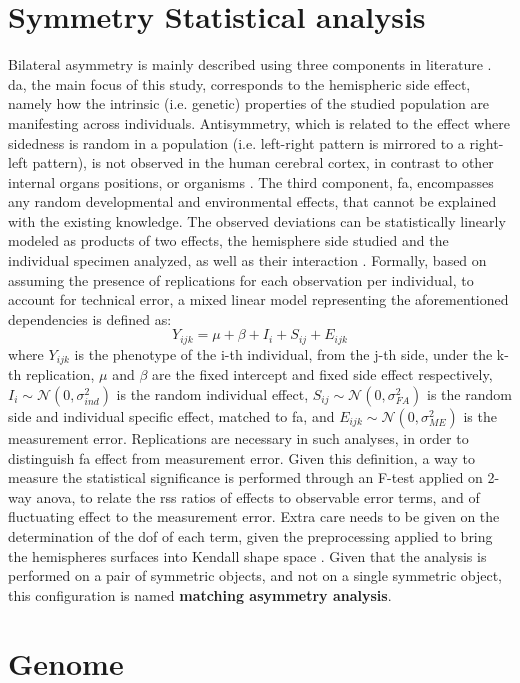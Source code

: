 \section{Symmetry Statistical analysis}
Bilateral asymmetry is mainly described using three components in literature \cite{klingenberg2002}\cite{Vingerhoets2021}. \Acf{da}, the main focus of this study, corresponds to the hemispheric side effect, namely how the intrinsic (i.e. genetic) properties of the studied population are manifesting across individuals. Antisymmetry, which is related to the effect where sidedness is random in a population (i.e. left-right pattern is mirrored to a right-left pattern), is not observed in the human cerebral cortex, in contrast to other internal organs positions, or organisms \cite{Neubauer2020}. The third component, \acf{fa}, encompasses any random developmental and environmental effects, that cannot be explained with the existing knowledge. The observed deviations can be statistically linearly modeled as products of two effects, the hemisphere side studied and the individual specimen analyzed, as well as their interaction \cite{klingenberg2002}. Formally, based on \cite{VanDongen1999} assuming the presence of replications for each observation per individual, to account for technical error, a mixed linear model representing the aforementioned dependencies is defined as:
\begin{equation}
	Y_{ijk} = \mu + \beta + I_i + S_{ij} + E_{ijk}
\end{equation}
where $Y_{ijk}$ is the phenotype of the i-th individual, from the j-th side, under the k-th replication, $\mu$ and $\beta$ are the fixed intercept and fixed side effect respectively, $I_i\sim\mathcal{N}(0,\sigma^2_{ind})$ is the random individual effect,  $S_{ij}\sim\mathcal{N}(0,\sigma^2_{FA})$ is the random side and individual specific effect, matched to \ac{fa}, and $E_{ijk}\sim\mathcal{N}(0,\sigma^2_{ME})$ is the measurement error. Replications are necessary in such analyses, in order to distinguish \ac{fa} effect from measurement error. Given this definition, a way to measure the statistical significance is performed through an F-test applied on 2-way \ac{anova}, to relate the \ac{rss} ratios of effects to observable error terms, and of fluctuating effect to the measurement error. Extra care needs to be given on the determination of the \ac{dof} of each term, given the preprocessing applied to bring the hemispheres surfaces into Kendall shape space \cite{klingenberg2002}. Given that the analysis is performed on a pair of symmetric objects, and not on a single symmetric object, this configuration is named \textbf{matching asymmetry analysis}.
\section{Genome}
